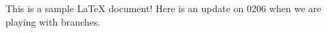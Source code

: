\documentclass[11pt,letterpaper]{article}
\begin{document}
	This is a sample LaTeX document!
Here is an update on 0206 when we are playing with branches.	
\end{document}

